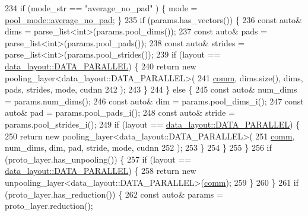 \begin{DoxyCode}
234     \textcolor{keywordflow}{if} (mode\_str == \textcolor{stringliteral}{"average\_no\_pad"} ) \{ mode = \hyperlink{base_8hpp_ac47a6ee5278a53898222a48639a2bf39ad91c68878ae16f6dfcd4e1551c33cdd1}{pool\_mode::average\_no\_pad}; \}
235     \textcolor{keywordflow}{if} (params.has\_vectors()) \{
236       \textcolor{keyword}{const} \textcolor{keyword}{auto}& dims = parse\_list<int>(params.pool\_dims());
237       \textcolor{keyword}{const} \textcolor{keyword}{auto}& pads = parse\_list<int>(params.pool\_pads());
238       \textcolor{keyword}{const} \textcolor{keyword}{auto}& strides = parse\_list<int>(params.pool\_strides());
239       \textcolor{keywordflow}{if} (layout == \hyperlink{base_8hpp_a786677cbfb3f5677b4d84f3056eb08dba37d2a3465f7cbf4ab60f4e79944d0638}{data\_layout::DATA\_PARALLEL}) \{
240         \textcolor{keywordflow}{return} \textcolor{keyword}{new} pooling\_layer<data\_layout::DATA\_PARALLEL>(
241                      \hyperlink{file__io_8cpp_ab048c6f9fcbcfaa57ce68b00263dbebe}{comm}, dims.size(), dims, pads, strides, mode, cudnn
242                    );
243       \}
244     \} \textcolor{keywordflow}{else} \{
245       \textcolor{keyword}{const} \textcolor{keyword}{auto}& num\_dims = params.num\_dims();
246       \textcolor{keyword}{const} \textcolor{keyword}{auto}& dim = params.pool\_dims\_i();
247       \textcolor{keyword}{const} \textcolor{keyword}{auto}& pad = params.pool\_pads\_i();
248       \textcolor{keyword}{const} \textcolor{keyword}{auto}& stride = params.pool\_strides\_i();
249       \textcolor{keywordflow}{if} (layout == \hyperlink{base_8hpp_a786677cbfb3f5677b4d84f3056eb08dba37d2a3465f7cbf4ab60f4e79944d0638}{data\_layout::DATA\_PARALLEL}) \{
250         \textcolor{keywordflow}{return} \textcolor{keyword}{new} pooling\_layer<data\_layout::DATA\_PARALLEL>(
251                      \hyperlink{file__io_8cpp_ab048c6f9fcbcfaa57ce68b00263dbebe}{comm}, num\_dims, dim, pad, stride, mode, cudnn
252                    );
253       \}
254     \}
255   \}
256   \textcolor{keywordflow}{if} (proto\_layer.has\_unpooling()) \{
257     \textcolor{keywordflow}{if} (layout == \hyperlink{base_8hpp_a786677cbfb3f5677b4d84f3056eb08dba37d2a3465f7cbf4ab60f4e79944d0638}{data\_layout::DATA\_PARALLEL}) \{
258       \textcolor{keywordflow}{return} \textcolor{keyword}{new} unpooling\_layer<data\_layout::DATA\_PARALLEL>(\hyperlink{file__io_8cpp_ab048c6f9fcbcfaa57ce68b00263dbebe}{comm});
259     \}
260   \}
261   \textcolor{keywordflow}{if} (proto\_layer.has\_reduction()) \{
262     \textcolor{keyword}{const} \textcolor{keyword}{auto}& params = proto\_layer.reduction();

\end{DoxyCode}
